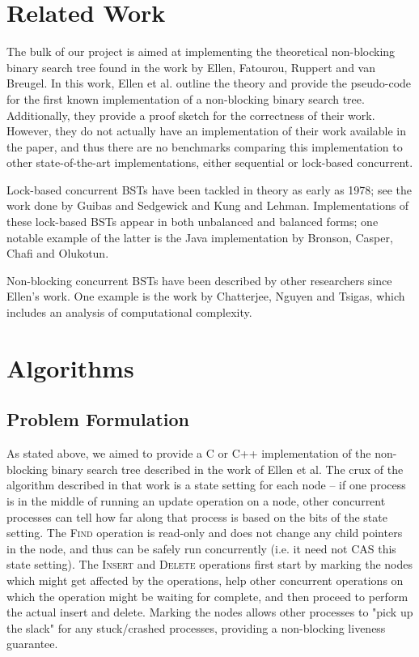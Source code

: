 \documentclass[10pt,pdftex,a4paper]{article}%
\begin{document}
\begin{multicols}{2}
\section{Related Work}

The bulk of our project is aimed at implementing the theoretical non-blocking binary search tree found in the work by Ellen, Fatourou, Ruppert and van Breugel.\cite{ellen10}  In this work, Ellen et al. outline the theory and provide the pseudo-code for the first known implementation of a non-blocking binary search tree.  Additionally, they provide a proof sketch for the correctness of their work.  However, they do not actually have an implementation of their work available in the paper, and thus there are no benchmarks comparing this implementation to other state-of-the-art implementations, either sequential or lock-based concurrent.

Lock-based concurrent BSTs have been tackled in theory as early as 1978; see the work done by Guibas and Sedgewick\cite{guibas78} and Kung and Lehman\cite{kung80}.  Implementations of these lock-based BSTs appear in both unbalanced and balanced forms; one notable example of the latter is the Java implementation by Bronson, Casper, Chafi and Olukotun\cite{bronson09}.

Non-blocking concurrent BSTs have been described by other researchers since Ellen's work.  One example is the work by Chatterjee, Nguyen and Tsigas\cite{chatterjee14}, which includes an analysis of computational complexity.

\section{Algorithms} 
\subsection{Problem Formulation}
As stated above, we aimed to provide a C or C++ implementation of the non-blocking binary search tree described in the work of Ellen et al. The crux of the algorithm described in that work is a state setting for each node -- if one process is in the middle of running an update operation on a node, other concurrent processes can tell how far along that process is based on the bits of the state setting.  The \textsc{Find} operation is read-only and does not change any child pointers in the node, and thus can be safely run concurrently (i.e. it need not CAS this state setting).  The \textsc{Insert} and \textsc{Delete} operations first start by marking the nodes which might get affected by the operations, help other concurrent operations on which the operation might be waiting for complete, and then proceed to perform the actual insert and delete. Marking the nodes allows other processes to "pick up the slack" for any stuck/crashed processes, providing a non-blocking liveness guarantee.


\end{multicols}
\end{document}
